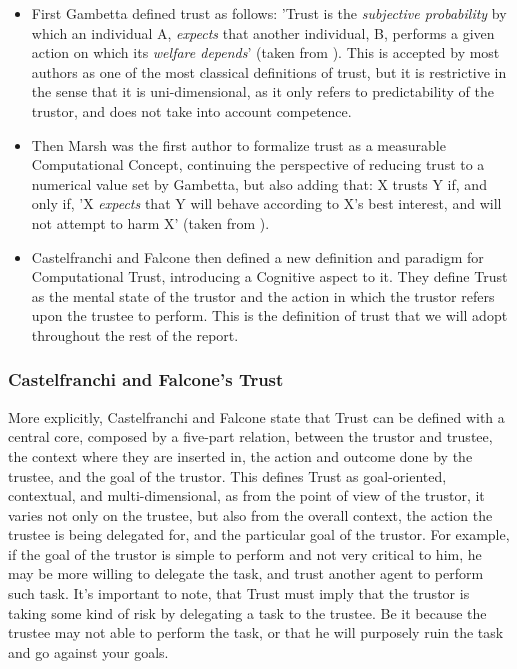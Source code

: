 \begin{itemize}
	\item First Gambetta\cite{Gambetta1988} defined trust as follows: 'Trust is the \textit{subjective probability} by which an individual A, \textit{expects} that another individual, B, performs a given action on which its \textit{welfare depends}' (taken from \cite{Castelfranchi2010}). This is accepted by most authors as one of the most classical definitions of trust, but it is restrictive in the sense that it is uni-dimensional, as it only refers to predictability of the trustor, and does not take into account competence.
	
	\item Then Marsh\cite{Marsh1994} was the first author to formalize trust as a measurable Computational Concept, continuing the perspective of reducing trust to a numerical value set by Gambetta\cite{Gambetta1988}, but also adding that: X trusts Y if, and only if, 'X \textit{expects} that Y will behave according to X's best interest, and will not attempt to harm X' (taken from \cite{Castelfranchi2010}).
	
	\item Castelfranchi and Falcone then defined a new definition and paradigm for Computational Trust, introducing a Cognitive aspect to it\cite{Castelfranchi1998}. They define Trust as the mental state of the trustor and the action in which the trustor refers upon the trustee to perform. This is the definition of trust that we will adopt throughout the rest of the report.
\end{itemize}

\subsubsection{Castelfranchi and Falcone's Trust}
\label{subsubsec:CastelfranchiTrust}
More explicitly, Castelfranchi and Falcone\cite{Castelfranchi1998} state that Trust can be defined with a central core, composed by a five-part relation, between the trustor and trustee, the context where they are inserted in, the action and outcome done by the trustee, and the goal of the trustor. This defines Trust as goal-oriented, contextual, and multi-dimensional, as from the point of view of the trustor, it varies not only on the trustee, but also from the overall context, the action the trustee is being delegated for, and the particular goal of the trustor. For example, if the goal of the trustor is simple to perform and not very critical to him, he may be more willing to delegate the task, and trust another agent to perform such task. It's important to note, that Trust must imply that the trustor is taking some kind of risk by delegating a task to the trustee. Be it because the trustee may not able to perform the task, or that he will purposely ruin the task and go against your goals.


